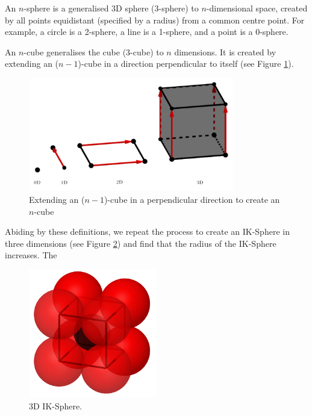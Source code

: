 \begin{definition}[$n$-Sphere]
    An $n$-sphere is a generalised 3D sphere (3-sphere) to $n$-dimensional space, created by all points equidistant (specified by a radius) from a common centre point. For example, a circle is a 2-sphere, a line is a 1-sphere, and a point is a 0-sphere.
\end{definition}

\begin{definition}[$n$-Cube]
    An $n$-cube generalises the cube (3-cube) to $n$ dimensions. It is created by extending an ($n-1$)-cube in a direction perpendicular to itself (see Figure \ref{fig:how to n cube}).
    \begin{figure}[h]
    \centering
    \includegraphics[width=0.8\textwidth]{images/how to make n sphere.png}
    \caption{\label{fig:how to n cube}Extending an ($n-1$)-cube in a perpendicular direction to create an $n$-cube}
    \end{figure}
\end{definition}
Abiding by these definitions, we repeat the process to create an IK-Sphere in three dimensions (see Figure \ref{fig:3d_IK_Sphere}) and find that the radius of the IK-Sphere increases. The 
\begin{figure}[h]
    \centering
    \includegraphics[width=0.5\textwidth]{images/3D IK.png}
    \caption{\label{fig:3d_IK_Sphere}3D IK-Sphere.}
\end{figure}






\researchquestion{}






